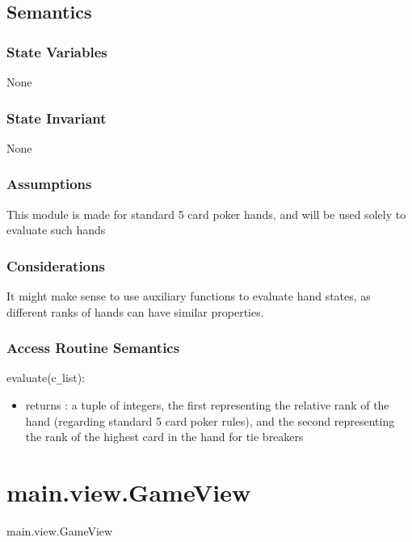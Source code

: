 \documentclass[12pt, titlepage]{article}
\begin{document}
\subsection* {Semantics}

\subsubsection* {State Variables}

None

\subsubsection* {State Invariant}

None

\subsubsection* {Assumptions}

This module is made for standard 5 card poker hands, and will be used solely to evaluate such hands

\subsubsection* {Considerations}

It might make sense to use auxiliary functions to evaluate hand states, as different ranks of hands can have similar properties.

\subsubsection* {Access Routine Semantics}

\noindent evaluate(c\verb|_|list):
\begin{itemize}
\item returns : a tuple of integers, the first representing the relative rank of the hand (regarding standard 5 card poker rules), and the second representing the rank of the highest card in the hand for tie breakers 
\end{itemize}


\section* {main.view.GameView}

main.view.GameView
\end{document}
